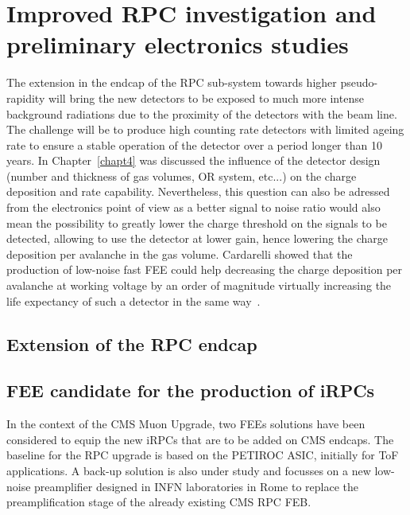\renewcommand\evenpagerightmark{{\scshape\small Chapter 6}}
\renewcommand\oddpageleftmark{{\scshape\small Improved RPC investigation and preliminary electronics studies}}

\renewcommand{\bibname}{References}

\hyphenation{}

\chapter[Improved RPC investigation and preliminary electronics studies]%
{Improved RPC investigation and preliminary electronics studies}
\label{chapt6}

	The extension in the endcap of the RPC sub-system towards higher pseudo-rapidity will bring the new detectors to be exposed to much more intense background radiations due to the proximity of the detectors with the beam line. The challenge will be to produce high counting rate detectors with limited ageing rate to ensure a stable operation of the detector over a period longer than 10 years. In Chapter~\ref{chapt4} was discussed the influence of the detector design (number and thickness of gas volumes, OR system, etc...) on the charge deposition and rate capability. Nevertheless, this question can also be adressed from the electronics point of view as a better signal to noise ratio would also mean the possibility to greatly lower the charge threshold on the signals to be detected, allowing to use the detector at lower gain, hence lowering the charge deposition per avalanche in the gas volume. Cardarelli showed that the production of low-noise fast FEE could help decreasing the charge deposition per avalanche at working voltage by an order of magnitude virtually increasing the life expectancy of such a detector in the same way~\cite{CARDARELLI2012}.
	
\section{Extension of the RPC endcap}
\label{chapt6:sec:iRPCs}

\section{FEE candidate for the production of iRPCs}
\label{chapt6:sec:candidates}

	In the context of the CMS Muon Upgrade, two \acf{FEE}s solutions have been considered to equip the new \acf{iRPC}s that are to be added on CMS endcaps. The baseline for the RPC upgrade is based on the PETIROC ASIC, initially for \acf{ToF} applications. A back-up solution is also under study and focusses on a new low-noise preamplifier designed in INFN laboratories in Rome to replace the preamplification stage of the already existing CMS RPC \acf{FEB}.

